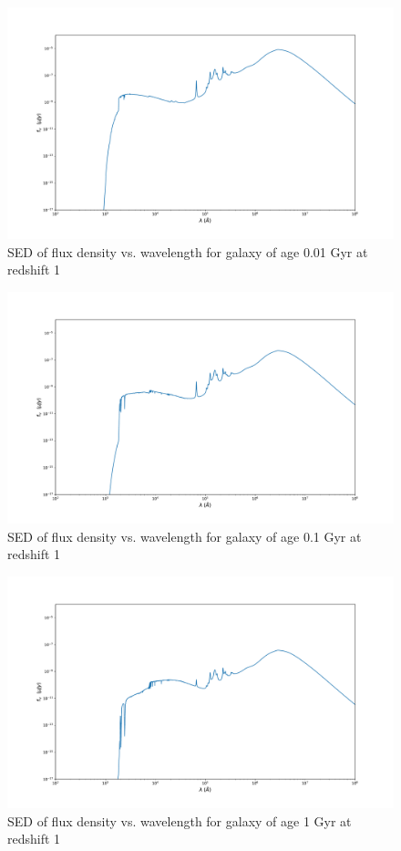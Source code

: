\documentclass{article}
\begin{document}
\begin{figure}[H]
  \centering
\includegraphics[scale=0.25]{SED age 0.01 redshift 1}
\caption{SED of flux density vs. wavelength for galaxy of age 0.01 Gyr at redshift 1}
\end{figure}

\begin{figure}[H]
  \centering
\includegraphics[scale=0.25]{SED age 0.1 redshift 1}
\caption{SED of flux density vs. wavelength for galaxy of age 0.1 Gyr at redshift 1}
\label{fig:9}
\end{figure}

\begin{figure}[H]
  \centering
\includegraphics[scale=0.25]{SED age 1 redshift 1}
\caption{SED of flux density vs. wavelength for galaxy of age 1 Gyr at redshift 1}
\end{figure}
\end{document}
